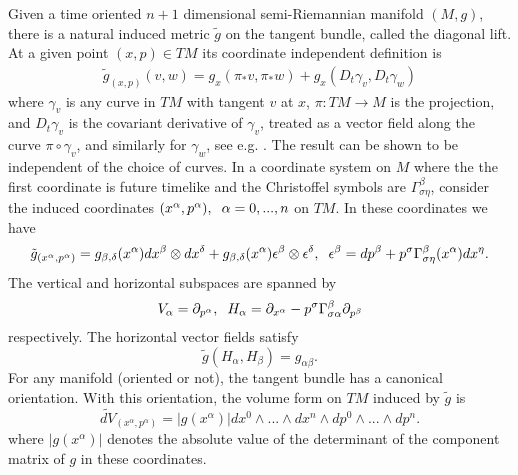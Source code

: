  Given a time oriented $n+1$ dimensional semi-Riemannian manifold $(M,g)$, there is a natural induced metric $\tilde{g}$ on the tangent bundle, called the diagonal lift.  At a given point $(x,p)\in TM$ its coordinate independent definition is
\begin{align}
\tilde{g}_{(x,p)}(v,w)=g_x(\pi_{*} v,\pi_{*} w)+g_x(D_t \gamma_v, D_t \gamma_w)
\end{align}
where $\gamma_v$ is any curve in $TM$ with tangent $v$ at $x$, $\pi:TM\longrightarrow M$ is the projection, and $D_t\gamma_v$ is the covariant derivative of $\gamma_v$, treated as a vector field along the curve $\pi\circ\gamma_v$, and similarly for $\gamma_w$, see e.g. \cite{pettini}. The result can be shown to be independent of the choice of curves.  In a coordinate system on $M$ where the the first coordinate is future timelike and the Christoffel symbols are $\Gamma^\beta_{\sigma\eta}$, consider the  induced coordinates $(x^\alpha,p^\alpha), \hspace{2mm}\alpha=0,...,n$ on $TM$.  In these coordinates we have 
\begin{equation}
\tilde{g}_{(x^\alpha,p^\alpha)}=g_{\beta,\delta}(x^\alpha)dx^\beta\otimes dx^\delta +g_{\beta,\delta}(x^{\alpha})\epsilon^\beta\otimes \epsilon^\delta, \hspace{2mm} \epsilon^\beta=dp^\beta+p^\sigma\Gamma^\beta_{\sigma\eta}(x^{\alpha})dx^\eta.
\end{equation}
The vertical and horizontal subspaces are spanned by
\begin{equation}\label{horizontal_subspace}
V_\alpha=\partial_{p^\alpha}, \hspace{2mm} H_\alpha=\partial_{x^\alpha}-p^\sigma\Gamma_{\sigma\alpha}^\beta\partial_{p^\beta}
\end{equation}
respectively.  The horizontal vector fields satisfy
\begin{equation}
\tilde{g}(H_\alpha,H_\beta)=g_{\alpha\beta}.
\end{equation}
For any manifold (oriented or not), the tangent bundle has a canonical orientation.  With this orientation, the volume form on $TM$ induced by $\tilde{g}$ is
\begin{equation}
\widetilde{dV}_{(x^\alpha,p^{\alpha})}=|g(x^\alpha)|dx^0\wedge...\wedge dx^n\wedge dp^0\wedge...\wedge dp^n.
\end{equation}
where $|g(x^\alpha)|$ denotes the absolute value of the determinant of the component matrix of $g$ in these coordinates.

